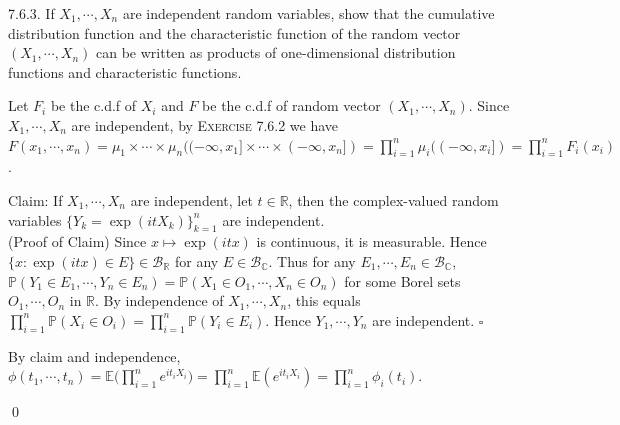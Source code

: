 \begin{exercise}7.6.3. If $X_1,\cdots, X_n$ are independent random variables, show that
the cumulative distribution function and the characteristic function of the random
vector $(X_1,\cdots, X_n)$ can be written as products of one-dimensional distribution
functions and characteristic functions.
\end{exercise}
\begin{answer}
    Let $F_i$ be the c.d.f of $X_i$ and $F$ be the c.d.f of random vector $(X_1,\cdots,X_n)$. Since $X_1,\cdots,X_n$ are independent, by \textsc{Exercise 7.6.2} we have $F(x_1,\cdots,x_n)=\mu_1\times\cdots\times\mu_n((-\infty,x_1]\times\cdots\times(-\infty,x_n])=\prod_{i=1}^n\mu_i((-\infty,x_i])=\prod_{i=1}^nF_i(x_i)$.

Claim: If $X_1,\cdots,X_n$ are independent, let $t\in\mathbb{R}$, then the complex-valued random variables $\{Y_k=\exp(itX_k)\}_{k=1}^n$ are independent.\\
(Proof of Claim) Since $x\mapsto\exp(itx)$ is continuous, it is measurable. Hence $\{x:\exp(itx)\in E\}\in\mathcal{B}_\mathbb{R}$ for any $E\in\mathcal{B}_\mathbb{C}$. Thus for any $E_1,\cdots,E_n\in\mathcal{B}_{\mathbb{C}}$, $\mathbb{P}(Y_1\in E_1,\cdots,Y_n\in E_n)=\mathbb{P}(X_1\in O_1,\cdots,X_n\in O_n)$ for some Borel sets $O_1,\cdots,O_n$ in $\mathbb{R}$. By independence of $X_1,\cdots,X_n$, this equals $\prod_{i=1}^n\mathbb{P}(X_i\in O_i)=\prod_{i=1}^n\mathbb{P}(Y_i\in E_i)$. Hence $Y_1,\cdots,Y_n$ are independent. $\square$

By claim and independence, $\phi(t_1,\cdots,t_n)=\mathbb{E}\big(\prod_{i=1}^n e^{it_iX_i}\big)=\prod_{i=1}^n\mathbb{E}(e^{it_iX_i})=\prod_{i=1}^n\phi_i(t_i)$.
\end{answer}\qed \qquad

